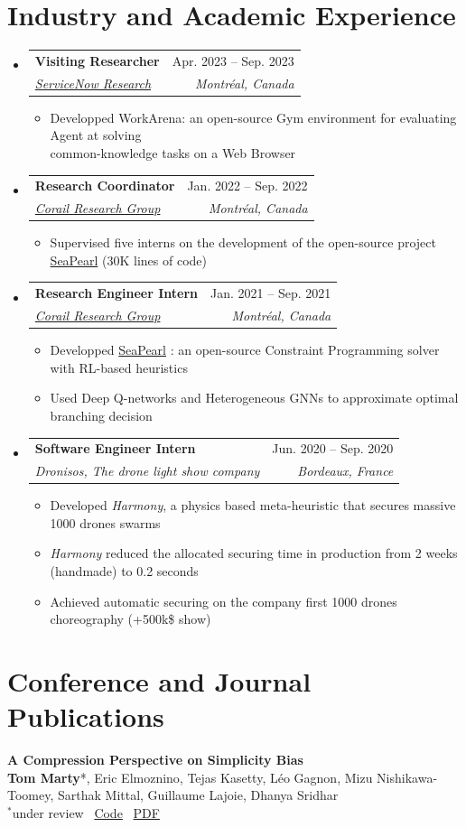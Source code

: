 \documentclass[letterpaper,11pt]{article}
\makeatletter
\newcommand{\resumeItem}[1]{
  \item\small{
    {#1 \vspace{-2pt}}
  }
}
\newcommand{\resumeSubheading}[4]{
  \vspace{-2pt}\item
    \begin{tabular*}{0.97\textwidth}[t]{l@{\extracolsep{\fill}}r}
      \textbf{#1} & #2 \\
      \textit{\small#3} & \textit{\small #4} \\
    \end{tabular*}\vspace{-7pt}
}
\newcommand{\resumeSubHeadingListStart}{\begin{itemize}[leftmargin=0.15in, label={}]}
\newcommand{\resumeSubHeadingListEnd}{\end{itemize}}
\newcommand{\resumeItemListStart}{\begin{itemize}}
\newcommand{\resumeItemListEnd}{\end{itemize}\vspace{-5pt}}
\makeatother
\begin{document}
\section{Industry and Academic Experience}
  \resumeSubHeadingListStart
      \resumeSubheading
      {Visiting Researcher}{Apr. 2023 -- Sep. 2023}
      {\href{https://corail-research.github.io/}{ServiceNow Research}}{Montréal, Canada}
    \resumeItemListStart
        \resumeItem{Developped WorkArena: an open-source Gym environment for evaluating Agent at solving \\ common-knowledge tasks on a Web Browser}
      \resumeItemListEnd
      \resumeSubheading
      {Research Coordinator}{Jan. 2022 -- Sep. 2022}
      {\href{https://corail-research.github.io/}{Corail Research Group}}{Montréal, Canada}
    \resumeItemListStart
        \resumeItem{Supervised five interns on the development of the open-source project \href{https://github.com/corail-research/SeaPearl.jl}{SeaPearl}  (30K lines of code)}
      \resumeItemListEnd
    \resumeSubheading
      {Research Engineer Intern}{Jan. 2021 -- Sep. 2021}
      {\href{https://corail-research.github.io/}{Corail Research Group}}{Montréal, Canada}
    \resumeItemListStart 
        \resumeItem{Developped \href{https://github.com/corail-research/SeaPearl.jl}{SeaPearl} : an open-source Constraint Programming solver with RL-based heuristics}
        \resumeItem{Used Deep Q-networks and Heterogeneous GNNs to approximate optimal branching decision}
    \resumeItemListEnd
    \resumeSubheading
      {Software Engineer Intern}{Jun. 2020 -- Sep. 2020}
      {Dronisos, The drone light show company}{Bordeaux, France}
      \resumeItemListStart
        \resumeItem{Developed \textit{Harmony}, a physics based meta-heuristic that secures massive 1000 drones swarms }
                \resumeItem{\textit{Harmony} reduced the allocated securing time in production from 2 weeks (handmade) to 0.2 seconds}
        \resumeItem{Achieved automatic securing on the company first 1000 drones choreography (+500k\$ show)}
      \resumeItemListEnd
    
  \resumeSubHeadingListEnd


\section{Conference and Journal Publications}
\begin{tcolorbox}[enhanced, rounded corners, colback=white, colframe=black!10!white, boxrule=0.5mm, left=10pt, right=10pt, top=6pt, bottom=3pt]
    \textbf{A Compression Perspective on Simplicity Bias} \\
    \textbf{Tom Marty}*, Eric Elmoznino, Tejas Kasetty, Léo Gagnon, Mizu Nishikawa-Toomey, Sarthak Mittal, Guillaume Lajoie, Dhanya Sridhar \\
    $^*$under review \hfill  \faCode  \, \href{https://github.com/3rdCore/complicity}{Code}  \quad
    \faFilePdf \, \href{https://3rdcore.github.io/data/complicity.pdf}{PDF}
\end{tcolorbox}
\end{document}
